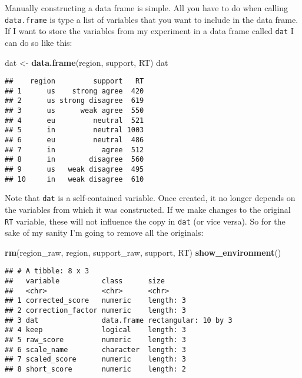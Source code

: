 \documentclass[]{book}
\newenvironment{Shaded}{\begin{snugshade}}{\end{snugshade}}
\newcommand{\KeywordTok}[1]{\textcolor[rgb]{0.13,0.29,0.53}{\textbf{#1}}}
\newcommand{\NormalTok}[1]{#1}
\newcommand{\StringTok}[1]{\textcolor[rgb]{0.31,0.60,0.02}{#1}}
\begin{document}
Manually constructing a data frame is simple. All you have to do when calling \texttt{data.frame} is type a list of variables that you want to include in the data frame. If I want to store the variables from my experiment in a data frame called \texttt{dat} I can do so like this:

\begin{Shaded}
\begin{Highlighting}[]
\NormalTok{dat <-}\StringTok{ }\KeywordTok{data.frame}\NormalTok{(region, support, RT)}
\NormalTok{dat}
\end{Highlighting}
\end{Shaded}

\begin{verbatim}
##    region         support   RT
## 1      us    strong agree  420
## 2      us strong disagree  619
## 3      us      weak agree  550
## 4      eu         neutral  521
## 5      in         neutral 1003
## 6      eu         neutral  486
## 7      in           agree  512
## 8      in        disagree  560
## 9      us   weak disagree  495
## 10     in   weak disagree  610
\end{verbatim}

Note that \texttt{dat} is a self-contained variable. Once created, it no longer depends on the variables from which it was constructed. If we make changes to the original \texttt{RT} variable, these will not influence the copy in \texttt{dat} (or vice versa). So for the sake of my sanity I'm going to remove all the originals:

\begin{Shaded}
\begin{Highlighting}[]
\KeywordTok{rm}\NormalTok{(region_raw, region, support_raw, support, RT)  }
\KeywordTok{show_environment}\NormalTok{() }
\end{Highlighting}
\end{Shaded}

\begin{verbatim}
## # A tibble: 8 x 3
##   variable          class      size                
##   <chr>             <chr>      <chr>               
## 1 corrected_score   numeric    length: 3           
## 2 correction_factor numeric    length: 3           
## 3 dat               data.frame rectangular: 10 by 3
## 4 keep              logical    length: 3           
## 5 raw_score         numeric    length: 3           
## 6 scale_name        character  length: 3           
## 7 scaled_score      numeric    length: 3           
## 8 short_score       numeric    length: 2
\end{verbatim}
\end{document}
